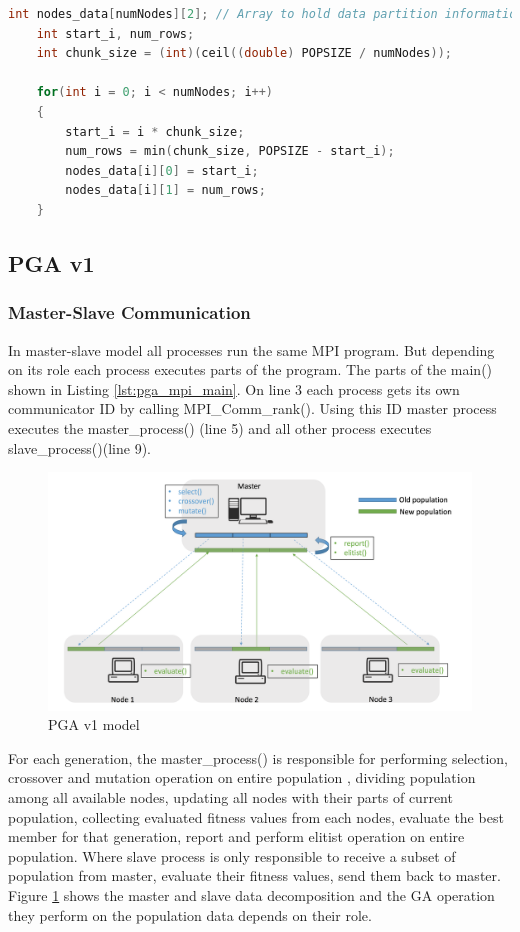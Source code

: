 \begin{lstlisting}[language=C, caption={Partitioning population data among nodes}, label={lst:pga_partitioning}]
    int nodes_data[numNodes][2]; // Array to hold data partition information
    int start_i, num_rows;
    int chunk_size = (int)(ceil((double) POPSIZE / numNodes));
               
    for(int i = 0; i < numNodes; i++)
    {
        start_i = i * chunk_size;
        num_rows = min(chunk_size, POPSIZE - start_i);
        nodes_data[i][0] = start_i;
        nodes_data[i][1] = num_rows;
    }
\end{lstlisting}

\subsection{PGA v1}

\subsubsection{Master-Slave Communication}
In master-slave model all processes run the same MPI program. But depending on its role each process executes parts of the program. The parts of the main() shown in Listing \ref{lst:pga_mpi_main}. On line 3 each process gets its own communicator ID by calling MPI\_Comm\_rank(). Using this ID master process executes the master\_process() (line 5) and all other process executes slave\_process()(line 9). 

\begin{figure}[!htb]
        \includegraphics[width= \linewidth]{figs/pga_model_v1.png}
    \caption{PGA v1 model}
     \label{fig:pga_model_v1}
\end{figure}

For each generation, the master\_process() is responsible for performing selection, crossover and mutation operation on entire population ,  dividing population among all available nodes, updating all nodes with their parts of current population, collecting evaluated fitness values from each nodes, evaluate the best member for that generation, report and perform elitist operation on entire population. Where slave process is only responsible to receive a subset of population from master, evaluate their fitness values, send them back to master.  Figure \ref{fig:pga_model_v1} shows the master and slave data decomposition and the GA operation they perform on the population data depends on their role.

